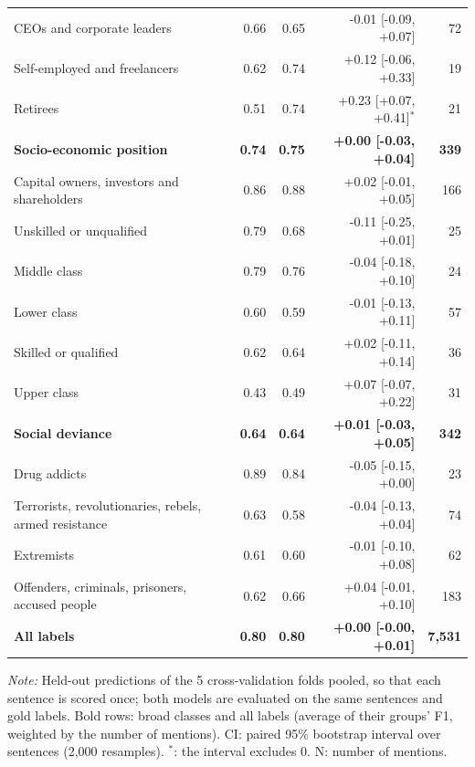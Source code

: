 \begin{table}[htbp]
\begin{threeparttable}
\begin{tabular}{l rr r r}
\quad CEOs and corporate leaders & 0.66 & 0.65 & -0.01 [-0.09, +0.07] & 72 \\
\quad Self-employed and freelancers & 0.62 & 0.74 & +0.12 [-0.06, +0.33] & 19 \\
\quad Retirees & 0.51 & 0.74 & +0.23 [+0.07, +0.41]$^{*}$ & 21 \\
\addlinespace
\textbf{Socio-economic position} & \textbf{0.74} & \textbf{0.75} & \textbf{+0.00 [-0.03, +0.04]} & \textbf{339} \\
\quad Capital owners, investors and shareholders & 0.86 & 0.88 & +0.02 [-0.01, +0.05] & 166 \\
\quad Unskilled or unqualified & 0.79 & 0.68 & -0.11 [-0.25, +0.01] & 25 \\
\quad Middle class & 0.79 & 0.76 & -0.04 [-0.18, +0.10] & 24 \\
\quad Lower class & 0.60 & 0.59 & -0.01 [-0.13, +0.11] & 57 \\
\quad Skilled or qualified & 0.62 & 0.64 & +0.02 [-0.11, +0.14] & 36 \\
\quad Upper class & 0.43 & 0.49 & +0.07 [-0.07, +0.22] & 31 \\
\addlinespace
\textbf{Social deviance} & \textbf{0.64} & \textbf{0.64} & \textbf{+0.01 [-0.03, +0.05]} & \textbf{342} \\
\quad Drug addicts & 0.89 & 0.84 & -0.05 [-0.15, +0.00] & 23 \\
\quad Terrorists, revolutionaries, rebels, armed resistance & 0.63 & 0.58 & -0.04 [-0.13, +0.04] & 74 \\
\quad Extremists & 0.61 & 0.60 & -0.01 [-0.10, +0.08] & 62 \\
\quad Offenders, criminals, prisoners, accused people & 0.62 & 0.66 & +0.04 [-0.01, +0.10] & 183 \\
\midrule
\textbf{All labels} & \textbf{0.80} & \textbf{0.80} & \textbf{+0.00 [-0.00, +0.01]} & \textbf{7,531} \\
\bottomrule
\end{tabular}
\begin{tablenotes}[flushleft]
\footnotesize
\item \textit{Note:} Held-out predictions of the 5 cross-validation folds pooled, so that each sentence is scored once; both models are evaluated on the same sentences and gold labels. Bold rows: broad classes and all labels (average of their groups' F1, weighted by the number of mentions). CI: paired 95\% bootstrap interval over sentences (2,000 resamples). $^{*}$: the interval excludes 0. N: number of mentions.
\end{tablenotes}
\end{threeparttable}
\end{table}
